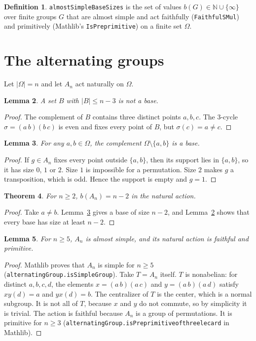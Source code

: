 \documentclass[11pt]{article}
\newtheorem{theorem}{Theorem}
\newtheorem{lemma}[theorem]{Lemma}
\theoremstyle{definition}
\newtheorem{definition}[theorem]{Definition}
\theoremstyle{remark}
\renewcommand{\_}{\oldus\allowbreak}
\begin{document}
\begin{definition}
\texttt{almostSimpleBaseSizes} is the set of values $b(G)\in\mathbb N\cup\{\infty\}$ over finite
groups $G$ that are almost simple and act faithfully (\texttt{FaithfulSMul}) and primitively
(Mathlib's \texttt{IsPreprimitive}) on a finite set $\Omega$.
\end{definition}

\section{The alternating groups}

Let $|\Omega| = n$ and let $A_n$ act naturally on $\Omega$.

\begin{lemma}\label{lem:lower}
A set $B$ with $|B|\le n-3$ is not a base.
\end{lemma}
\begin{proof}
The complement of $B$ contains three distinct points $a,b,c$. The 3-cycle
$\sigma=(a\,b)(b\,c)$ is even and fixes every point of $B$, but $\sigma(c)=a\ne c$.
\end{proof}

\begin{lemma}\label{lem:upper}
For any $a,b\in\Omega$, the complement $\Omega\setminus\{a,b\}$ is a base.
\end{lemma}
\begin{proof}
If $g\in A_n$ fixes every point outside $\{a,b\}$, then its support lies in $\{a,b\}$, so it has
size $0$, $1$ or $2$. Size $1$ is impossible for a permutation. Size $2$ makes $g$ a transposition,
which is odd. Hence the support is empty and $g=1$.
\end{proof}

\begin{theorem}\label{thm:b}
For $n\ge2$, $b(A_n)=n-2$ in the natural action.
\end{theorem}
\begin{proof}
Take $a\ne b$. Lemma~\ref{lem:upper} gives a base of size $n-2$, and Lemma~\ref{lem:lower} shows
that every base has size at least $n-2$.
\end{proof}

\begin{lemma}\label{lem:as}
For $n\ge5$, $A_n$ is almost simple, and its natural action is faithful and primitive.
\end{lemma}
\begin{proof}
Mathlib proves that $A_n$ is simple for $n\ge5$ (\texttt{alternatingGroup.isSimpleGroup}). Take
$T=A_n$ itself. $T$ is nonabelian: for distinct $a,b,c,d$, the elements $x=(a\,b)(a\,c)$ and
$y=(a\,b)(a\,d)$ satisfy $xy(d)=a$ and $yx(d)=b$. The centralizer of $T$ is the center, which is a
normal subgroup. It is not all of $T$, because $x$ and $y$ do not commute, so by simplicity it is
trivial. The action is faithful because $A_n$ is a group of permutations. It is primitive for
$n\ge3$ (\texttt{alternatingGroup.isPreprimitive\_of\_three\_le\_card} in Mathlib).
\end{proof}
\end{document}
